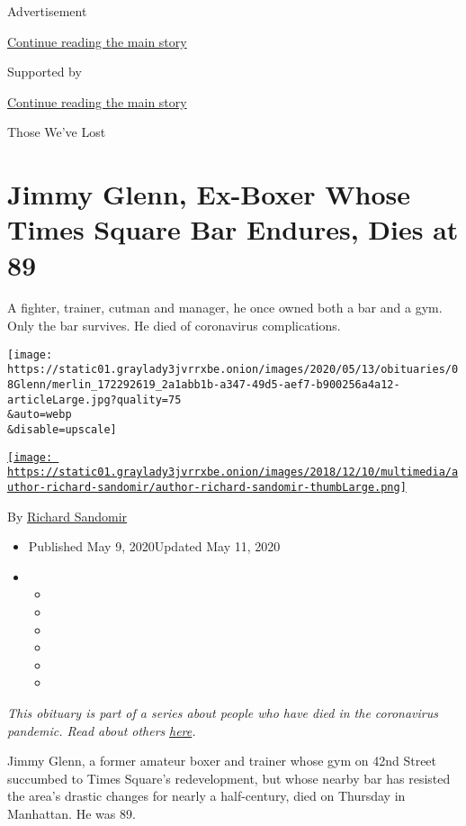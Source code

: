 Advertisement

\protect\hyperlink{after-top}{Continue reading the main story}

Supported by

\protect\hyperlink{after-sponsor}{Continue reading the main story}

Those We've Lost

\hypertarget{jimmy-glenn-ex-boxer-whose-times-square-bar-endures-dies-at-89}{%
\section{Jimmy Glenn, Ex-Boxer Whose Times Square Bar Endures, Dies at
89}\label{jimmy-glenn-ex-boxer-whose-times-square-bar-endures-dies-at-89}}

A fighter, trainer, cutman and manager, he once owned both a bar and a
gym. Only the bar survives. He died of coronavirus complications.

\texttt{[image: https://static01.graylady3jvrrxbe.onion/images/2020/05/13/obituaries/08Glenn/merlin\_172292619\_2a1abb1b-a347-49d5-aef7-b900256a4a12-articleLarge.jpg?quality=75\\\&auto=webp\\\&disable=upscale]}

\href{https://www.nytimes3xbfgragh.onion/by/richard-sandomir}{\texttt{[image: https://static01.graylady3jvrrxbe.onion/images/2018/12/10/multimedia/author-richard-sandomir/author-richard-sandomir-thumbLarge.png]}}

By \href{https://www.nytimes3xbfgragh.onion/by/richard-sandomir}{Richard
Sandomir}

\begin{itemize}
\item
  Published May 9, 2020Updated May 11, 2020
\item
  \begin{itemize}
  \item
  \item
  \item
  \item
  \item
  \item
  \end{itemize}
\end{itemize}

\emph{This obituary is part of a series about people who have died in
the coronavirus pandemic. Read about others}
\href{https://www.nytimes3xbfgragh.onion/series/people-who-have-died-of-the-coronavirus}{\emph{here}}\emph{.}

Jimmy Glenn, a former amateur boxer and trainer whose gym on 42nd Street
succumbed to Times Square's redevelopment, but whose nearby bar has
resisted the area's drastic changes for nearly a half-century, died on
Thursday in Manhattan. He was 89.


